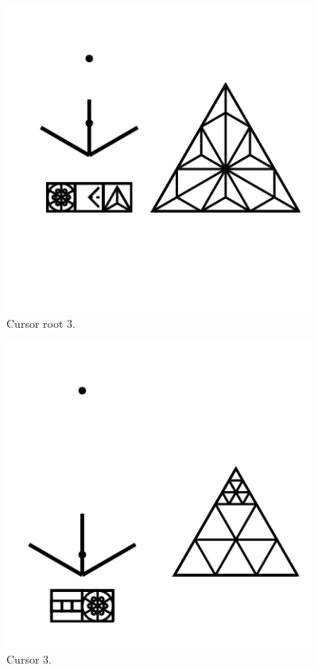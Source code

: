 \begin{figure}
	\centering
	\includegraphics[width=4in]{figures/web2d/cursorroot3.png}
	\caption[cursorroot3]
	{Cursor root 3.}
\end{figure}
\begin{figure}
	\centering
	\includegraphics[width=4in]{figures/web2d/cursor3.png}
	\caption[cursor3]
	{Cursor 3.}
\end{figure}
